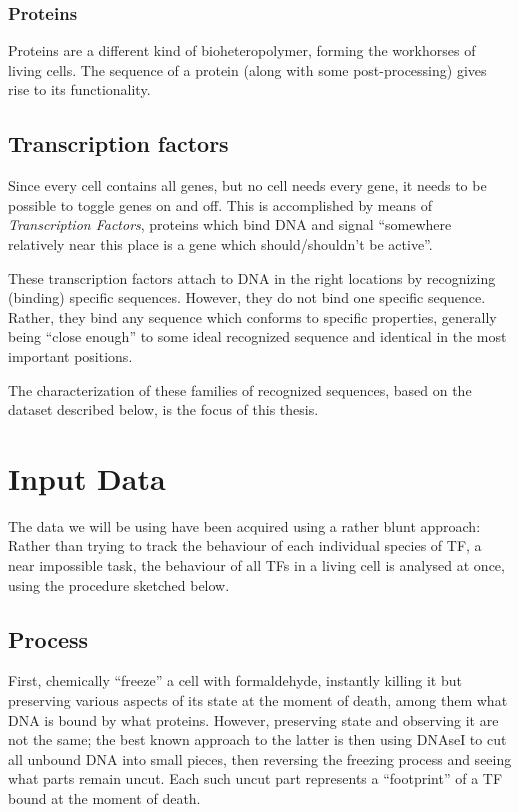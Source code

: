 \documentclass[fleqn]{book}
\begin{document}
\subsection{Proteins}\label{proteins}

Proteins are a different kind of bioheteropolymer, forming the
workhorses of living cells. The sequence of a protein (along with some
post-processing) gives rise to its functionality.

\section{Transcription factors}\label{transcription-factors}

Since every cell contains all genes, but no cell needs every gene, it
needs to be possible to toggle genes on and off. This is accomplished by
means of \emph{Transcription Factors}, proteins which bind DNA and
signal ``somewhere relatively near this place is a gene which
should/shouldn't be active''.

These transcription factors attach to DNA in the right locations by
recognizing (binding) specific sequences. However, they do not bind one
specific sequence. Rather, they bind any sequence which conforms to
specific properties, generally being ``close enough'' to some ideal
recognized sequence and identical in the most important positions.

The characterization of these families of recognized sequences, based on
the dataset described below, is the focus of this thesis.

\chapter{Input Data}\label{input-data}

The data we will be using have been acquired using a rather blunt
approach: Rather than trying to track the behaviour of each individual
species of TF, a near impossible task, the behaviour of all TFs in a
living cell is analysed at once, using the procedure sketched below.

\section{Process}\label{process}

First, chemically ``freeze'' a cell with formaldehyde, instantly killing
it but preserving various aspects of its state at the moment of death,
among them what DNA is bound by what proteins. However, preserving state
and observing it are not the same; the best known approach to the latter
is then using DNAseI to cut all unbound DNA into small pieces, then
reversing the freezing process and seeing what parts remain uncut. Each
such uncut part represents a ``footprint'' of a TF bound at the moment
of death.
\end{document}
